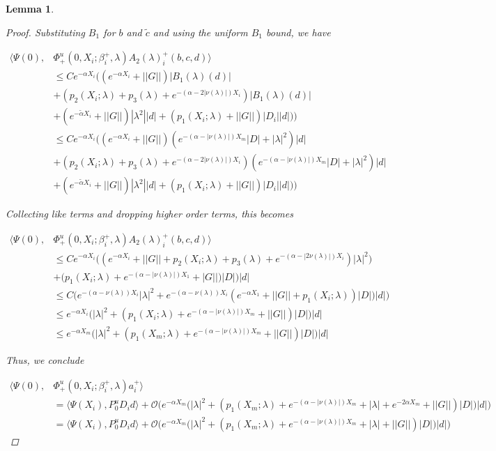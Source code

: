 \documentclass[12pt]{article}
\newtheorem{lemma}{Lemma}
\begin{document}
\begin{lemma}
\begin{proof}
Substituting $B_1$ for $b$ and $\tilde{c}$ and using the uniform $B_1$ bound, we have

\begin{align*}
\langle \Psi(0), &\Phi^u_+(0, X_i; \beta_i^+, \lambda) A_2(\lambda)_i^+(b,c,d) \rangle \\
&\leq C e^{-\alpha X_i}  \Big( (e^{-\alpha X_i} + ||G||)|B_1(\lambda)(d)| \\
&+ ( p_2(X_i; \lambda) + p_3(\lambda) + e^{-(\alpha - 2|\nu(\lambda)|)X_i} )|B_1(\lambda)(d)| \\
&+ (e^{-\tilde{\alpha} X_i} + ||G||) |\lambda^2| |d| +(p_1(X_i; \lambda) + ||G|| )|D_i||d|) \Big) \\
&\leq C e^{-\alpha X_i}  \Big( (e^{-\alpha X_i} + ||G||)( e^{-(\alpha - |\nu(\lambda)|) X_m} |D| + |\lambda|^2 )|d| \\
&+ ( p_2(X_i; \lambda) + p_3(\lambda) + e^{-(\alpha - 2|\nu(\lambda)|)X_i} )( e^{-(\alpha - |\nu(\lambda)|) X_m} |D| + |\lambda|^2 )|d| \\
&+ (e^{-\tilde{\alpha} X_i} + ||G||) |\lambda^2| |d| +(p_1(X_i; \lambda) + ||G|| )|D_i||d|) \Big) 
\end{align*}

Collecting like terms and dropping higher order terms, this becomes

\begin{align*}
\langle \Psi(0), &\Phi^u_+(0, X_i; \beta_i^+, \lambda) A_2(\lambda)_i^+(b,c,d) \rangle \\
&\leq C e^{-\alpha X_i} \Big( (e^{-\alpha X_i} + ||G|| + p_2(X_i; \lambda) + p_3(\lambda) + e^{-(\alpha - |2 \nu(\lambda)|)X_i} ) |\lambda|^2 ) \\
&+ (p_1(X_i; \lambda) + e^{-(\alpha - |\nu(\lambda)|) X_1} + |G|| )|D| \Big)|d| \\
&\leq C \Big( e^{-(\alpha - \nu(\lambda)) X_i} |\lambda|^2 
+ e^{-(\alpha - \nu(\lambda)) X_i}( e^{-\alpha X_1} + ||G|| + p_1(X_i; \lambda))|D| )|d| \Big) \\
&\leq e^{-\alpha X_i} \Big( |\lambda|^2  + (p_1(X_i; \lambda) + e^{-(\alpha - |\nu(\lambda)|) X_m} + ||G|| )|D| \Big)|d| \\
&\leq e^{-\alpha X_m} \Big( |\lambda|^2  + (p_1(X_m; \lambda) + e^{-(\alpha - |\nu(\lambda)|) X_m} + ||G|| )|D| \Big)|d| 
\end{align*}

Thus, we conclude

\begin{align*}
\langle \Psi(0), &\Phi^u_+(0, X_i; \beta_i^+, \lambda) a_i^+ \rangle \\
&= \langle \Psi(X_i), P^u_0 D_i d \rangle + \mathcal{O}\Big(e^{-\alpha X_m} \Big( |\lambda|^2  + (p_1(X_m; \lambda) + e^{-(\alpha - |\nu(\lambda)|) X_m} + |\lambda| + e^{-2 \alpha X_m} + ||G|| )|D| \Big)|d|  \Big) \\
&= \langle \Psi(X_i), P^u_0 D_i d \rangle + \mathcal{O}\Big(e^{-\alpha X_m} \Big( |\lambda|^2  + (p_1(X_m; \lambda) + e^{-(\alpha - |\nu(\lambda)|) X_m} + |\lambda| + ||G|| )|D| \Big)|d| \Big)
\end{align*}



\end{proof}
\end{lemma}
\end{document}
